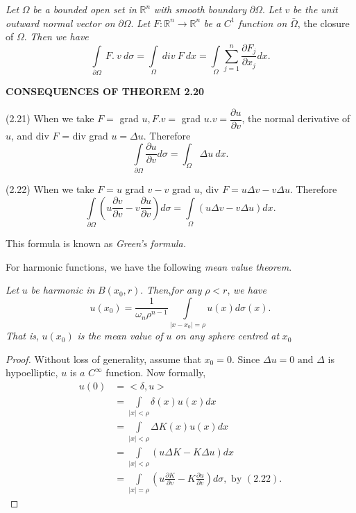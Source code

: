\setcounter{thm}{19}
\begin{thm}\label{chap2:sec4:thm2.20} %
  { \em Let} $\Omega$ {\em be a bounded open
    set in} $\mathbb{R}^n$ {\em  with smooth boundary } $\partial \Omega
  $. {\em Let} $v$ {\em  be the unit outward normal vector on }
  $\partial \Omega$. {\em Let} $F:\mathbb{R}^n\to \mathbb{R}^n$ {\em
    be a } $C^1$ 
  {\em  function on} $\bar{\Omega}$, the closure of $\Omega$. {\em Then
    we have} 
  $$
  \int\limits_{\partial\Omega}~ F. ~v~ d\sigma = \int\limits_{\Omega}
  ~div ~F~ dx= \int\limits_{\Omega} \sum^{n}_{j=1} \frac{\partial
    F_j}{\partial x_j} dx. 
  $$\pageoriginale
\end{thm}

\noindent \textbf{CONSEQUENCES OF THEOREM 2.20}

\noindent(2.21) \qquad 
When we take $F=$ grad $u, F.v =$ grad $u.v = \dfrac{\partial
  u}{\partial v}$, the normal derivative of $u$, and div $F$ = div
grad $u=\Delta u$. Therefore 
$$
\int\limits_{\partial \Omega} \frac{\partial u}{\partial v} d\sigma =
\int_{\Omega} \Delta u ~ dx. 
$$

\noindent (2.22) \quad 
When we take $F = u$ grad $v-v$ grad $u$, div $F=u \Delta v-v \Delta
u$. Therefore 
$$
\int\limits_{\partial \Omega} \left(u\frac{\partial v}{\partial v} - v
\frac{\partial u}{\partial v}\right) d\sigma = \int\limits_{\Omega} (u
\Delta v- v\Delta u)dx. 
$$

This formula is known as \textit{Green's formula.}

For harmonic functions, we have the following \textit{ mean value theorem}. 

\setcounter{thm}{22}
\begin{thm} \label{chap2:sec4:thm2.23}%
   {\em Let} $u$ {\em be harmonic in} $B(x_0, r)$. {\em Then},{\em for
     any} $\rho < r$, {\em we have} 
   $$
   u(x_0)=\frac{1}{\omega_n \rho^{n-1}} \int\limits_{\mid x-x_0\mid
     =\rho} u(x)d\sigma(x). 
   $$
   {\em That is}, $u(x_0)$ {\em is the mean value of $u$ on any sphere
     centred at } $x_0$ 
\end{thm} 

\begin{proof}%
   Without loss of generality, assume that $x_0=0$. Since $\Delta u =0
\text { and } \Delta$ is hypoelliptic, $u$ is $a$ $C^\infty$
function. Now formally, 
 \begin{align*}
   u(0) &= <\delta, u>\\
   &= \int\limits_{\mid x \mid < \rho} \delta (x) u(x) dx\\
   &= \int\limits_{\mid x \mid < \rho} \Delta K(x) u(x) dx\\
   & = \int\limits_{\mid x \mid < \rho} (u \Delta K - K \Delta u) dx\\
   &= \int\limits_{\mid x \mid = \rho} \left(u \frac{\partial K}{\partial
     v}- K\frac{\partial u}{\partial v}\right)d \sigma, \text { by }
   (2.22).
\end{align*}\pageoriginale 
 \end{proof} 

